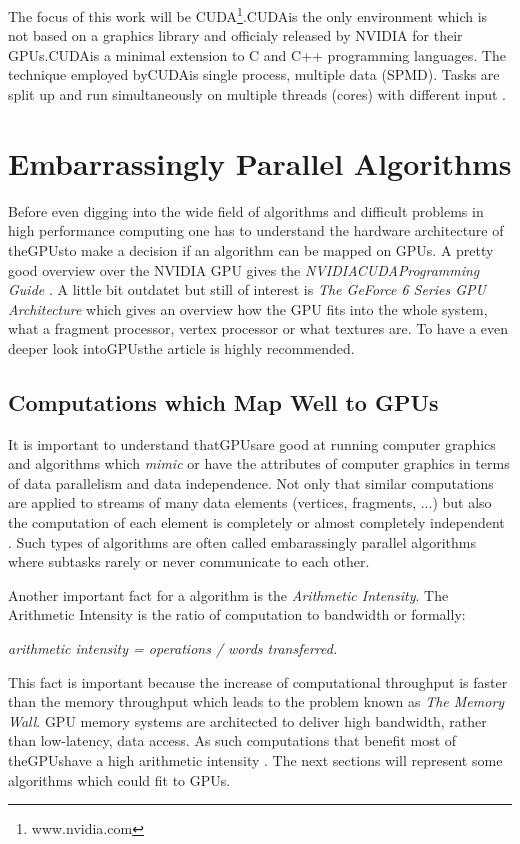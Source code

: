 The focus of this work will be CUDA\footnote{www.nvidia.com}.\gls{CUDA}is the only
environment which is not based on a graphics library and officialy released by
NVIDIA for their GPUs.\gls{CUDA}is a minimal extension to C and C++ programming
languages. The technique employed by\gls{CUDA}is single process, multiple data
(SPMD). Tasks are split up and run simultaneously on multiple threads (cores)
with different input \citep{citeulike:3072519}.

\section{Embarrassingly Parallel Algorithms} %
\label{ssub:choosing_a_fast_algorithm}
Before even digging into the wide field of algorithms and difficult problems in
high performance computing one has to understand the hardware architecture of
the\glspl{GPU}to make a decision if an algorithm can be mapped on GPUs. A pretty good
overview over the NVIDIA \gls{GPU} gives the \emph{NVIDIA\gls{CUDA}Programming Guide}
\citep{citeulike:3325943}. A little bit outdatet but still of interest is
\emph{The GeForce 6 Series \gls{GPU} Architecture}\citep{citeulike:3757915} which gives
an overview how the \gls{GPU} fits into the whole system, what a fragment processor,
vertex processor or what textures are. To have a even deeper look into\glspl{GPU}the
article \citep{citeulike:2790995} is highly recommended.

\subsection{Computations which Map Well to GPUs} %
\label{par:computations_which_map_well_to_GPUs}
It is important to understand that\glspl{GPU}are good at running computer graphics
and algorithms which \emph{mimic} or have the attributes of computer graphics in
terms of data parallelism and data independence. Not only that similar
computations are applied to streams of many data elements (vertices, fragments,
...) but also the computation of each element is completely or almost completely
independent \citep{citeulike:3733428}. Such types of algorithms are often called
embarassingly parallel algorithms where subtasks rarely or never communicate to
each other.

Another important fact for a algorithm is the \emph{Arithmetic Intensity}. The
Arithmetic Intensity is the ratio of computation to bandwidth or formally:
\begin{center} 
 \emph{arithmetic intensity = operations / words transferred.}
\end{center}
This fact is important because the increase of computational throughput is
faster than the memory throughput which leads to the problem known as \emph{The
Memory Wall}. \gls{GPU} memory systems are architected to deliver high bandwidth,
rather than low-latency, data access. As such computations that benefit most of
the\glspl{GPU}have a high arithmetic intensity \citep{citeulike:3733428}. The next 
sections will represent some algorithms which could fit to GPUs. 


